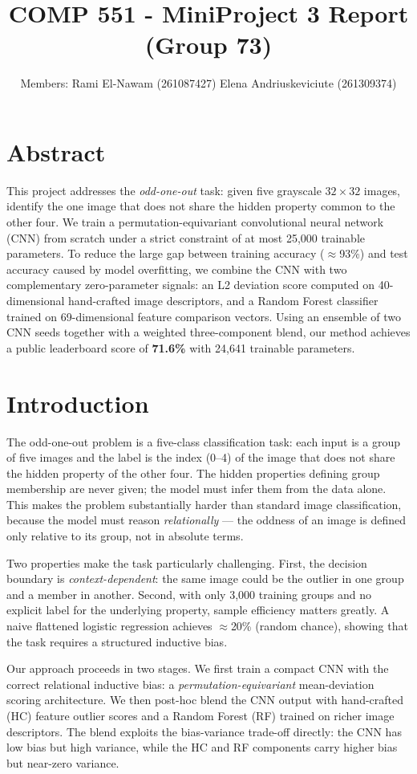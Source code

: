 \documentclass[11pt]{article}
\title{\textbf{COMP 551 - MiniProject 3 Report (Group 73)}}
\author{Members: Rami El-Nawam (261087427) \quad Elena Andriuskeviciute (261309374)}
\date{}
\begin{document}
\maketitle

\section{Abstract}
This project addresses the \emph{odd-one-out} task: given five grayscale $32\times32$ images, identify
the one image that does not share the hidden property common to the other four. We train a
permutation-equivariant convolutional neural network (CNN) from scratch under a strict constraint of
at most 25{,}000 trainable parameters. To reduce the large gap between training accuracy ($\approx$93\%)
and test accuracy caused by model overfitting, we combine the CNN with two complementary
zero-parameter signals: an L2 deviation score computed on 40-dimensional hand-crafted image
descriptors, and a Random Forest classifier trained on 69-dimensional feature comparison vectors.
Using an ensemble of two CNN seeds together with a weighted three-component blend, our method
achieves a public leaderboard score of \textbf{71.6\%} with 24{,}641 trainable parameters.


\section{Introduction}

The odd-one-out problem is a five-class classification task: each input is a group of five images and the
label is the index (0--4) of the image that does not share the hidden property of the other four. The
hidden properties defining group membership are never given; the model must infer them from the data
alone. This makes the problem substantially harder than standard image classification, because the model
must reason \emph{relationally} — the oddness of an image is defined only relative to its group, not in
absolute terms.

Two properties make the task particularly challenging. First, the decision boundary is
\emph{context-dependent}: the same image could be the outlier in one group and a member in another.
Second, with only 3{,}000 training groups and no explicit label for the underlying property, sample
efficiency matters greatly. A naive flattened logistic regression achieves $\approx$20\% (random chance),
showing that the task requires a structured inductive bias.

Our approach proceeds in two stages. We first train a compact CNN with the correct relational inductive
bias: a \emph{permutation-equivariant} mean-deviation scoring architecture. We then post-hoc blend the
CNN output with hand-crafted (HC) feature outlier scores and a Random Forest (RF) trained on richer
image descriptors. The blend exploits the bias-variance trade-off directly: the CNN has low bias but high
variance, while the HC and RF components carry higher bias but near-zero variance.
\end{document}
